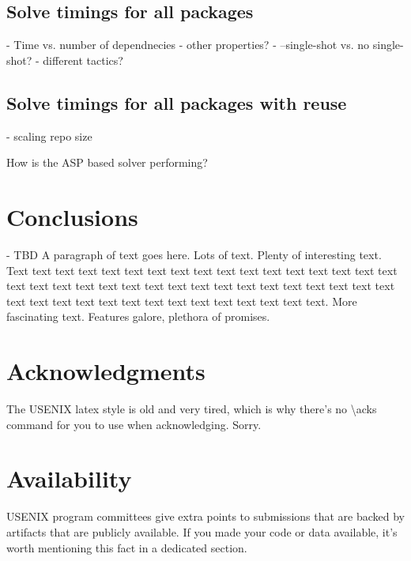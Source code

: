 \subsection{Solve timings for all packages}





- Time vs. number of dependnecies
- other properties?
- --single-shot vs. no single-shot?
- different tactics?

\subsection{Solve timings for all packages with reuse}
- scaling repo size


How is the ASP based solver performing?

\section{Conclusions}
- TBD
A paragraph of text goes here. Lots of text. Plenty of interesting
text. Text text text text text text text text text text text text text
text text text text text text text text text text text text text text
text text text text text text text text text text text text text text
text text text text text text text.
More fascinating text. Features galore, plethora of promises.

\section*{Acknowledgments}
The USENIX latex style is old and very tired, which is why
there's no \textbackslash{}acks command for you to use when
acknowledging. Sorry.

\section*{Availability}

USENIX program committees give extra points to submissions that are
backed by artifacts that are publicly available. If you made your code
or data available, it's worth mentioning this fact in a dedicated
section.

{
   \footnotesize
   
   
}



